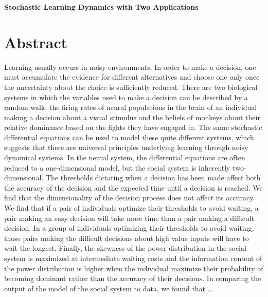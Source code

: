 \documentclass{article}
\begin{document}
\begin{center}
\Large

\end{center}


\vspace{0pt}

\begin{center}
{\bf \LARGE{Stochastic Learning Dynamics with Two Applications}}
\end{center}

\tableofcontents

\section{Abstract}
Learning usually occurs in noisy environments.  In order to make a decision, one must accumulate the  evidence for different alternatives and choose one only once the uncertainty about the choice is sufficiently reduced.  There are two biological systems in which the variables used to make a decision can be described by a random walk: the firing rates of neural populations in the brain of an individual making a decision about a visual stimulus and the beliefs of monkeys about their relative dominance based on the fights they have engaged in.  The same stochastic differential equations can be used to model these quite different systems, which suggests that there are universal principles underlying learning through noisy dynamical systems.  In the neural system, the differential equations are often reduced to a one-dimensional model, but the social system is inherently two-dimensional.  The thresholds dictating when a decision has been made affect both the accuracy of the decision and the expected time until a decision is reached. We find that the dimensionality of the decision process does not affect its accuracy.  We find that if a pair of individuals optimize their thresholds to avoid waiting, a pair making an easy decision will take more time than a pair making a difficult decision.  In a group of individuals optimizing their thresholds to avoid waiting, those pairs making the difficult decisions about high value inputs will have to wait the longest.  Finally, the skewness of the power distribution in the social system is maximized at intermediate waiting costs and the information content of the power distribution is higher when the individual maximize their probability of becoming dominant rather than the accuracy of their decisions. In comparing the output of the model of the social system to data, we found that ...
\end{document}
